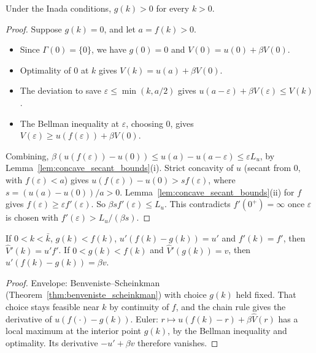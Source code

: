 \begin{lemma}
\label{lem:rck_policy_pos}
\leanok
{}
Under the Inada conditions, $g(k) > 0$ for every $k > 0$.
\end{lemma}
\begin{proof}
\leanok
Suppose $g(k) = 0$, and let $a = f(k) > 0$.
\begin{itemize}
\item Since $\Gamma(0) = \{0\}$, we have $g(0) = 0$ and $V(0) = u(0) + \beta V(0)$.
\item Optimality of $0$ at $k$ gives $V(k) = u(a) + \beta V(0)$.
\item The deviation to save $\varepsilon \le \min(k, a/2)$ gives $u(a-\varepsilon) + \beta V(\varepsilon) \le V(k)$.
\item The Bellman inequality at $\varepsilon$, choosing $0$, gives $V(\varepsilon) \ge u(f(\varepsilon)) + \beta V(0)$.
\end{itemize}
Combining, $\beta(u(f(\varepsilon)) - u(0)) \le u(a) - u(a-\varepsilon) \le \varepsilon L_u$, by
Lemma~\ref{lem:concave_secant_bounds}(i). Strict concavity of $u$ (secant from $0$, with $f(\varepsilon) < a$) gives
$u(f(\varepsilon)) - u(0) > s f(\varepsilon)$, where $s = (u(a) - u(0))/a > 0$. Lemma~\ref{lem:concave_secant_bounds}(ii)
for $f$ gives $f(\varepsilon) \ge \varepsilon f'(\varepsilon)$. So $\beta s f'(\varepsilon) \le L_u$. This
contradicts $f'(0^+) = \infty$ once $\varepsilon$ is chosen with $f'(\varepsilon) > L_u/(\beta s)$.
\end{proof}

\begin{lemma}
\label{lem:rck_envelope_euler}
\leanok
{}
If $0 < k < \bar k$, $g(k) < f(k)$, $u'(f(k) - g(k)) = u'$ and $f'(k) = f'$, then $\hat V'(k) = u' f'$.
If $0 < g(k) < f(k)$ and $\hat V'(g(k)) = v$, then $u'(f(k) - g(k)) = \beta v$.
\end{lemma}
\begin{proof}
\leanok
Envelope: Benveniste--Scheinkman (Theorem~\ref{thm:benveniste_scheinkman}) with choice $g(k)$ held fixed. That
choice stays feasible near $k$ by continuity of $f$, and the chain rule gives the derivative of $u(f(\cdot) - g(k))$.
Euler: $r \mapsto u(f(k) - r) + \beta \hat V(r)$ has a local maximum at the interior point $g(k)$, by the Bellman
inequality and optimality. Its derivative $-u' + \beta v$ therefore vanishes.
\end{proof}

